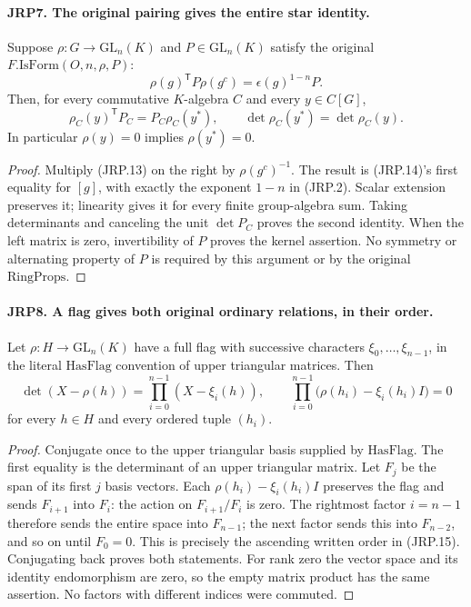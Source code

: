 \documentclass[11pt,a4paper]{article}
\numberwithin{equation}{section}
\theoremstyle{remark}\newtheorem{remark}[theorem]{Remark}
\begin{document}
\paragraph{JRP7. The original pairing gives the entire star identity.}
\label{claim:JRP7}
Suppose \(\rho:G\to\mathrm{GL}_n(K)\) and
\(P\in\mathrm{GL}_n(K)\) satisfy the original
\(F.\mathrm{IsForm}(O,n,\rho,P)\):
\[
 \rho(g)^{\mathsf T}P\rho(g^c)=\epsilon(g)^{1-n}P.
 \tag{JRP.13}
\]
Then, for every commutative \(K\)-algebra \(C\) and every
\(y\in C[G]\),
\[
 \rho_C(y)^{\mathsf T}P_C=P_C\rho_C(y^*),\qquad
       \det\rho_C(y^*)=\det\rho_C(y).
 \tag{JRP.14}
\]
In particular \(\rho(y)=0\) implies \(\rho(y^*)=0\).
\begin{proof}
Multiply (JRP.13) on the right by \(\rho(g^c)^{-1}\).
The result is (JRP.14)'s first equality for \([g]\), with
exactly the exponent \(1-n\) in (JRP.2).  Scalar extension
preserves it; linearity gives it for every finite group-algebra
sum.  Taking determinants and canceling the unit \(\det P_C\)
proves the second identity.  When the left matrix is zero,
invertibility of \(P\) proves the kernel assertion.  No symmetry
or alternating property of \(P\) is required by this argument
or by the original \(\mathrm{RingProps}\).
\end{proof}

\paragraph{JRP8. A flag gives both original ordinary relations, in their order.}
\label{claim:JRP8}
Let \(\rho:H\to\mathrm{GL}_n(K)\) have a full flag with
successive characters \(\xi_0,\ldots,\xi_{n-1}\), in the
literal \(\mathrm{HasFlag}\) convention of upper triangular
matrices.  Then
\[
 \det(X-\rho(h))=\prod_{i=0}^{n-1}(X-\xi_i(h)),
 \qquad
 \prod_{i=0}^{n-1}\bigl(\rho(h_i)-\xi_i(h_i)I\bigr)=0
 \tag{JRP.15}
\]
for every \(h\in H\) and every ordered tuple \((h_i)\).
\begin{proof}
Conjugate once to the upper triangular basis supplied by
\(\mathrm{HasFlag}\).  The first equality is the determinant
of an upper triangular matrix.  Let \(F_j\) be the span of
its first \(j\) basis vectors.  Each
\(\rho(h_i)-\xi_i(h_i)I\) preserves the flag and sends
\(F_{i+1}\) into \(F_i\): the action on
\(F_{i+1}/F_i\) is zero.  The rightmost factor \(i=n-1\)
therefore sends the entire space into \(F_{n-1}\); the next
factor sends this into \(F_{n-2}\), and so on until \(F_0=0\).
This is precisely the ascending written order in (JRP.15).
Conjugating back proves both statements.  For rank zero the
vector space and its identity endomorphism are zero, so the empty
matrix product has the same assertion.  No factors with different
indices were commuted.
\end{proof}
\end{document}
